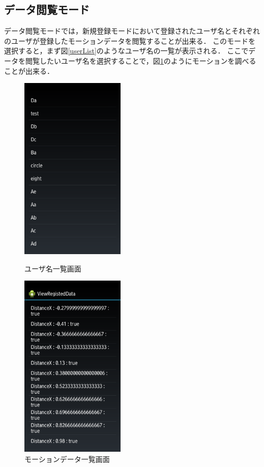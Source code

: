 \documentclass[11pt]{jreport}
\begin{document}
	    \subsection{データ閲覧モード}
	    データ閲覧モードでは，新規登録モードにおいて登録されたユーザ名とそれぞれのユーザが登録したモーションデータを閲覧することが出来る．
        このモードを選択すると，まず図\ref{userList}のようなユーザ名の一覧が表示される．
        ここでデータを閲覧したいユーザ名を選択することで，図\ref{dataList}のようにモーションを調べることが出来る．

        \begin{figure}[tbp]
            \begin{minipage}{0.5\hsize}
                \begin{center}
                    \includegraphics[width=5cm, bb=0 0 540 960]{UserList.pdf}
                \end{center}
                \caption{ユーザ名一覧画面}
                \label{userList}
            \end{minipage}
            \begin{minipage}{0.5\hsize}
                \begin{center}
                    \includegraphics[width=5cm, bb=0 0 540 960]{DataList.pdf}
                \end{center}
                \caption{モーションデータ一覧画面}
                \label{dataList}
            \end{minipage}
        \end{figure}
\end{document}
